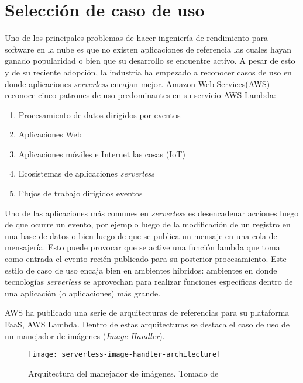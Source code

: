 \section{Selección de caso de uso}
Uno de los principales problemas de hacer ingeniería de rendimiento para software en la nube es que no existen aplicaciones de referencia las cuales hayan ganado popularidad o bien que su desarrollo se encuentre activo. A pesar de esto y de su reciente adopción, la industria ha empezado a reconocer casos de uso en donde aplicaciones \emph{serverless} encajan mejor. Amazon Web Services(AWS)\cite{serverless-architecture-patterns} reconoce cinco patrones de uso predominantes en su servicio AWS Lambda:
\begin{enumerate}
    \item Procesamiento de datos dirigidos por eventos
    \item Aplicaciones Web
    \item Aplicaciones móviles e Internet las cosas (IoT)
    \item Ecosistemas de aplicaciones \emph{serverless}
    \item Flujos de trabajo dirigidos eventos
\end{enumerate}
 
Uno de las aplicaciones más comunes en \emph{serverless} es desencadenar acciones luego de que ocurre un evento, por ejemplo luego de la modificación de un registro en una base de datos o bien luego de que se publica un mensaje en una cola de mensajería. Esto puede provocar que se active una función lambda que toma como entrada el evento recién publicado para su posterior procesamiento. Este estilo de caso de uso encaja bien en ambientes híbridos: ambientes en donde tecnologías \emph{serverless} se aprovechan para realizar funciones específicas dentro de una aplicación (o aplicaciones) más grande.

AWS ha publicado una serie de arquitecturas de referencias\cite{aws-lambda-ref-arch} para su plataforma FaaS, AWS Lambda. Dentro de estas arquitecturas se destaca el caso de uso de un manejador de imágenes (\emph{Image Handler})\cite{aws-lambda-image-handler}. 

\begin{figure}[h]
  \centering
  \texttt{[image: serverless-image-handler-architecture]}
  \caption[Arquitectura del manejador de imágenes]{Arquitectura del manejador de imágenes. Tomado de \protect\cite{aws-lambda-image-handler}}
  \label{fig:serverless-image-handler-architecture}
\end{figure}

